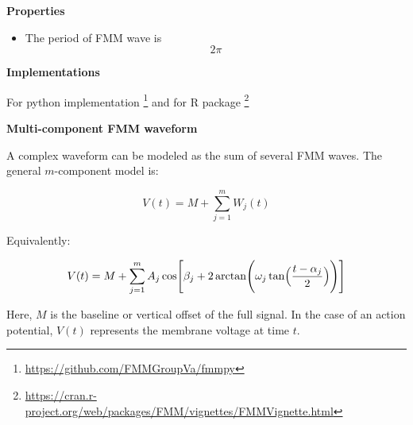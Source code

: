 \documentclass{book}
\providecommand{\ProjectDeepHeading}[2]{%
    \par\medskip\noindent\textbf{#2}\par\smallskip
}
\providecommand{\seeherefooter}[1]{\footnote{\url{#1}}}
\begin{document}
   \ProjectDeepHeading{11}{Properties}
      \begin{itemize}
         \item The period of FMM wave is $$2\ensuremath{\pi}$$
      \end{itemize}


   \ProjectDeepHeading{11}{Implementations}
      For python implementation \seeherefooter{https://github.com/FMMGroupVa/fmmpy} and for R package \seeherefooter{https://cran.r-project.org/web/packages/FMM/vignettes/FMMVignette.html}


\ProjectDeepHeading{12}{Multi-component FMM waveform}
    
    A complex waveform can be modeled as the sum of several FMM waves.
    The general $m$-component model is:
    
    \begin{equation}
        V(t)
        =
        M
        +
        \sum_{j=1}^{m}
        W_j(t)
    \end{equation}
    
    Equivalently:
    
    \begin{equation}
        V(t)
        =
        M
        +
        \sum_{j=1}^{m}
        A_j
        \cos
        \Biggl[
            \ensuremath{\beta}_j
            +
            2
            \arctan
            \Biggl(
            \ensuremath{\omega}_j
            \tan
            \Bigl(
            \frac{t-\ensuremath{\alpha}_j}{2}
            \Bigr)
            \Biggr)
            \Biggr]
    \end{equation}
    
    Here, $M$ is the baseline or vertical offset of the full signal.
    In the case of an action potential, $V(t)$ represents the membrane voltage at time $t$.
    \cite{rueda-2021-a-novel-wave-decomposition-for-oscillatory-signals}

\end{document}
